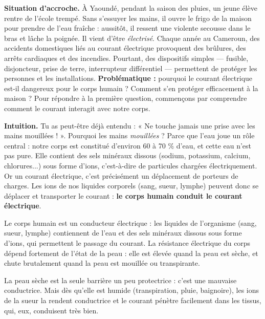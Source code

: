 \documentclass[11pt]{article}
\newcommand{\cle}[1]{{\popxbold\color{popdark}#1}}
\newcounter{popsec}
\newcounter{popsub}
\newcommand{\courssub}[1]{%
  \stepcounter{popsub}%
  \par\vspace{9pt}\noindent{\popxbold\fontsize{11.5}{13}\selectfont\color{popink}{\color{poporange}\thepopsec.\thepopsub}\hspace{6pt}#1}\par\nopagebreak\vspace{4pt}
}
\begin{document}
\textbf{Situation d'accroche.} À Yaoundé, pendant la saison des pluies, un jeune élève rentre de l'école trempé. Sans s'essuyer les mains, il ouvre le frigo de la maison pour prendre de l'eau fraîche : aussitôt, il ressent une violente secousse dans le bras et lâche la poignée. Il vient d'être \emph{électrisé}. Chaque année au Cameroun, des accidents domestiques liés au courant électrique provoquent des brûlures, des arrêts cardiaques et des incendies. Pourtant, des dispositifs simples — fusible, disjoncteur, prise de terre, interrupteur différentiel — permettent de protéger les personnes et les installations. \textbf{Problématique :} pourquoi le courant électrique est-il dangereux pour le corps humain ? Comment s'en protéger efficacement à la maison ? Pour répondre à la première question, commençons par comprendre comment le courant interagit avec notre corps.

\courssub{Le corps humain est un conducteur électrique}

\textbf{Intuition.} Tu as peut-être déjà entendu : « Ne touche jamais une prise avec les mains mouillées ! ». Pourquoi les mains \emph{mouillées} ? Parce que l'eau joue un rôle central : notre corps est constitué d'environ \cle{60 à 70 \% d'eau}, et cette eau n'est pas pure. Elle contient des \cle{sels minéraux dissous} (sodium, potassium, calcium, chlorures...) sous forme d'\cle{ions}, c'est-à-dire de particules chargées électriquement. Or un courant électrique, c'est précisément un déplacement de porteurs de charges. Les ions de nos liquides corporels (sang, sueur, lymphe) peuvent donc se déplacer et transporter le courant : \textbf{le corps humain conduit le courant électrique}.

\begin{propriete}
Le corps humain est un \cle{conducteur électrique} : les liquides de l'organisme (sang, sueur, lymphe) contiennent de l'eau et des sels minéraux dissous sous forme d'\cle{ions}, qui permettent le passage du courant. La résistance électrique du corps dépend fortement de l'état de la peau : elle est élevée quand la peau est sèche, et chute brutalement quand la peau est mouillée ou transpirante.
\end{propriete}

La peau sèche est la seule barrière un peu protectrice : c'est une mauvaise conductrice. Mais dès qu'elle est humide (transpiration, pluie, baignoire), les ions de la sueur la rendent conductrice et le courant pénètre facilement dans les tissus, qui, eux, conduisent très bien.
\end{document}
